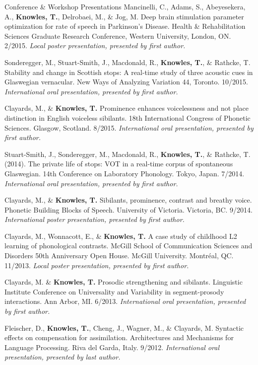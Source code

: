 \documentclass{resume} %
\begin{document}
\begin{rSection}{Conference \& Workshop Presentations}
	Mancinelli, C., Adams, S., Abeyesekera, A., {\bf Knowles, T.}, Delrobaei, M., \& Jog, M. Deep brain stimulation parameter optimization for rate of speech in Parkinson's Disease. Health \& Rehabilitation Sciences Graduate Research Conference, Western University, London, ON. 2/2015. \emph{Local poster presentation, presented by first author.}
	
	Sonderegger, M., Stuart-Smith, J., Macdonald, R., {\bf Knowles, T.}, \& Rathcke, T. Stability and change in Scottish stops: A real-time study of three acoustic cues in Glaswegian vernacular. New Ways of Analyzing Variation 44, Toronto. 10/2015. \emph{International oral presentation, presented by first author.}
	
	Clayards, M., \& {\bf Knowles, T.} Prominence enhances voicelessness and not place distinction in English voiceless sibilants. 18th International Congress of Phonetic Sciences. Glasgow, Scotland. 8/2015. \emph{International oral presentation, presented by first author.}
	
	Stuart-Smith, J., Sonderegger, M., Macdonald, R., {\bf Knowles, T.}, \& Rathcke, T. (2014). The private life of stops: VOT in a real-time corpus of spontaneous Glaswegian. 14th Conference on Laboratory Phonology. Tokyo, Japan. 7/2014. \emph{International oral presentation, presented by first author.}
	
	Clayards, M., \& {\bf Knowles, T.} Sibilants, prominence, contrast and breathy voice. Phonetic Building Blocks of Speech. University of Victoria. Victoria, BC. 9/2014. \emph{International poster presentation, presented by first author.}
	
	Clayards, M., Wonnacott, E., \& {\bf Knowles, T.} A case study of childhood L2 learning of phonological contrasts. McGill School of Communication Sciences and Disorders 50th Anniversary Open House. McGill University. Montr\'eal, QC. 11/2013. \emph{Local poster presentation, presented by first author.}
	
	Clayards, M. \& {\bf Knowles, T.} Prosodic strengthening and sibilants. Linguistic Institute Conference on Universality and Variability in segment-prosody interactions. Ann Arbor, MI. 6/2013. \emph{International oral presentation, presented by first author.}
	
	
	Fleischer, D., {\bf Knowles, T.}, Cheng, J., Wagner, M., \& Clayards, M. Syntactic effects on compensation for assimilation. Architectures and Mechanisms for Language Processing. Riva del Garda, Italy. 9/2012. \emph{International oral presentation, presented by last author.}
	

\end{rSection}
\end{document}
